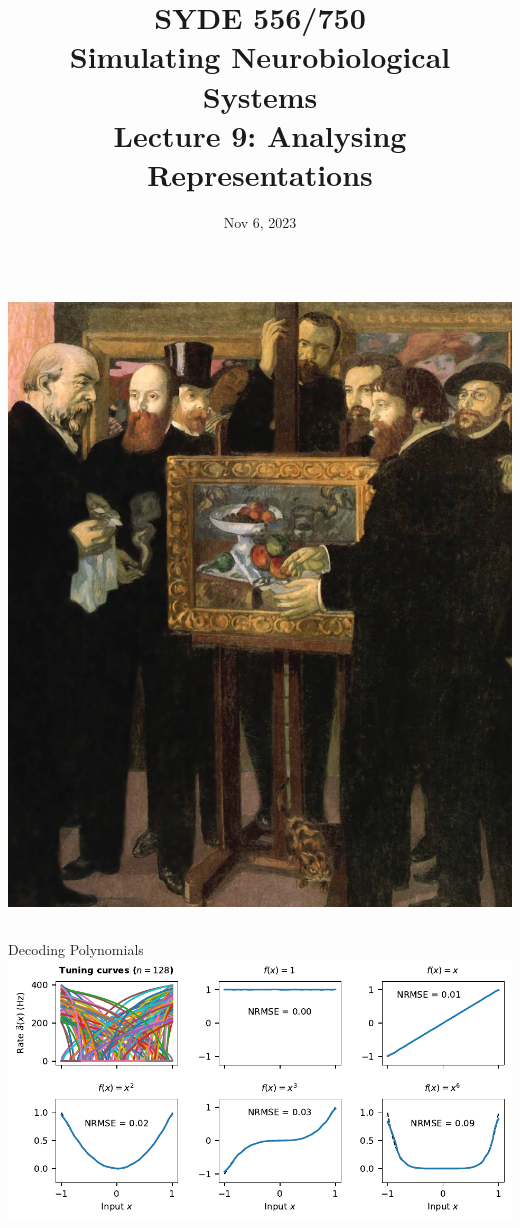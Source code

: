 \documentclass[handout,aspectratio=169]{beamer}
\date{Nov 6, 2023}
\title{SYDE 556/750 \\ Simulating Neurobiological Systems \\ Lecture 9: Analysing Representations}
\begin{document}
	
	\begin{frame}{}
		\vspace{0.5cm}
		\begin{columns}[c]
			\MakeTitle
			\includegraphics[width=\textwidth]{media/maurice_denis_homage_to_cezanne_1900_small.jpg}
		\end{columns}
	\end{frame}

	\begin{frame}{Decoding Polynomials}
		\centering
		\includegraphics[width=\textwidth]{media/poly_decodings.pdf} 
	\end{frame}
\end{document}
